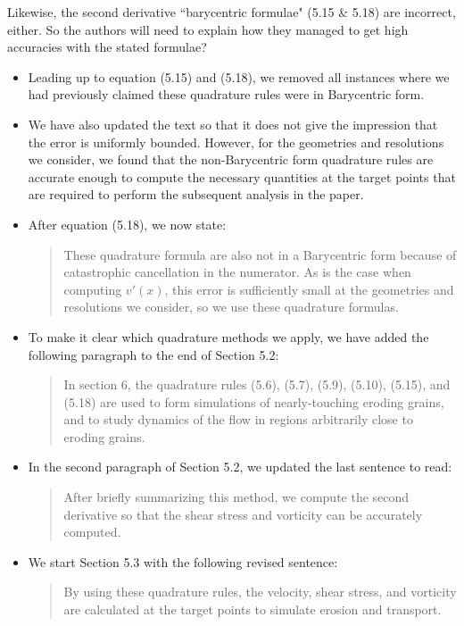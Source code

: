 \documentclass[11pt]{article}
\newcommand{\comment}[1]{{\color{blue} #1}}
\begin{document}
\noindent
\comment{Likewise, the second derivative ``barycentric formulae" (5.15 \& 5.18) are incorrect, either. So the authors will need to explain how they managed to get high accuracies with the stated formulae?}
\begin{itemize}
  \item Leading up to equation (5.15) and (5.18), we removed all
    instances where we had previously claimed these quadrature rules
    were in Barycentric form.

  \item We have also updated the text so that it does not give the
    impression that the error is uniformly bounded. However, for the
    geometries and resolutions we consider, we found that the
    non-Barycentric form quadrature rules are accurate enough to compute
    the necessary quantities at the target points that are required to
    perform the subsequent analysis in the paper.

  \item After equation (5.18), we now state:
    \begin{quotation}
      \noindent
      These quadrature formula are also not in a Barycentric form
      because of catastrophic cancellation in the numerator. As is the
      case when computing $v′(x)$, this error is sufficiently small at
      the geometries and resolutions we consider, so we use these
      quadrature formulas.
    \end{quotation}

  \item To make it clear which quadrature methods we apply, we have
    added the following paragraph to the end of Section 5.2:
    \begin{quotation}
      \noindent
      In section 6, the quadrature rules (5.6), (5.7), (5.9), (5.10),
      (5.15), and (5.18) are used to form simulations of nearly-touching
      eroding grains, and to study dynamics of the flow in regions
      arbitrarily close to eroding grains.
    \end{quotation}

  \item In the second paragraph of Section 5.2, we updated the last
    sentence to read:
    \begin{quotation}
      \noindent
      After briefly summarizing this method, we compute the second
      derivative so that the shear stress and vorticity can be
      accurately computed.
    \end{quotation}

  \item We start Section 5.3 with the following revised sentence:
    \begin{quotation}
      \noindent
      By using these quadrature rules, the velocity, shear stress, and
      vorticity are calculated at the target points to simulate erosion
      and transport.
    \end{quotation}

\end{itemize}
\end{document}

